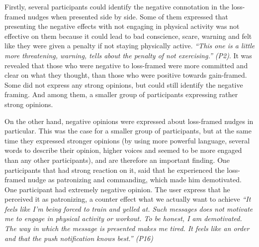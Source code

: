 Firstly, several participants could identify the negative connotation in the loss-framed nudges when presented side by side. Some of them expressed that presenting the negative effects with not engaging in physical activity was not effective on them because it could lead to bad conscience, scare, warning and felt like they were given a penalty if not staying physically active. \textit{“This one is a little more threatening, warning, tells about the penalty of not exercising.” (P2)}. It was revealed that those who were negative to loss-framed were more committed and clear on what they thought, than those who were positive towards gain-framed. Some did not express any strong opinions, but could still identify the negative framing. And among them, a smaller group of participants expressing rather strong opinions.

On the other hand, negative opinions were expressed about loss-framed nudges in particular. This was the case for a smaller group of participants, but at the same time they expressed stronger opinions (by using more powerful language, several words to describe their opinion, higher voices and seemed to be more engaged than any other participants), and are therefore an important finding. One participants that had strong reaction on it, said that he experienced the loss-framed nudge as patronizing and commanding, which made him demotivated. One participant had extremely negative opinion. The user express that he perceived it as patronizing, a counter effect what we actually want to achieve
\textit{“It feels like I'm being forced to train and yelled at. Such messages does not motivate me to engage in physical activity or workout. To be honest, I am demotivated. The way in which the message is presented makes me tired. It feels like an order and that the push notification knows best.” (P16)}

\begin{comment}
\begin{table}[ht]
\centering
\begin{tabular}{lllll}
\cline{2-4}
\multicolumn{1}{l|}{}                               & \multicolumn{1}{l|}{\textbf{Gain}} & \multicolumn{1}{l|}{\textbf{Loss}} & \multicolumn{1}{l|}{\textbf{None}} &  \\ \cline{1-4}
\multicolumn{1}{|l|}{\textbf{Extrinsic motivation}} & \multicolumn{1}{c|}{10}            & \multicolumn{1}{c|}{2} & \multicolumn{1}{c|}{1} &  \\ \cline{1-4}\multicolumn{1}{|l|}{\textbf{Intrinsic motivation}} & \multicolumn{1}{c|}{5} & \multicolumn{1}{c|}{1} & \multicolumn{1}{c|}{3} &  \\ \cline{1-4}
&&&& 
\end{tabular}
\caption{\label: Shows how many participants preferred the different wording of the message.}
\end{table}
\end{comment}


